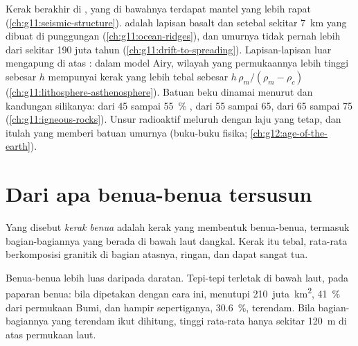\begin{recall}
Kerak berakhir di , yang di bawahnya terdapat mantel yang lebih rapat
(\cref{ch:g11:seismic-structure}).  adalah lapisan basalt dan 
setebal sekitar \qty{7}{km} yang dibuat di punggungan
(\cref{ch:g11:ocean-ridges}), dan umurnya tidak pernah lebih dari sekitar 190
juta tahun (\cref{ch:g11:drift-to-spreading}). Lapisan-lapisan luar mengapung
di atas : dalam model Airy, wilayah yang permukaannya lebih tinggi
sebesar $h$ mempunyai kerak yang lebih tebal sebesar $h\,\rho_m/(\rho_m -
\rho_c)$ (\cref{ch:g11:lithosphere-asthenosphere}). Batuan beku dinamai
menurut  dan kandungan silikanya:  dari 45 sampai
\qty{55}{\percent} ,  dari 55 sampai 65,  dari 65
sampai 75 (\cref{ch:g11:igneous-rocks}). Unsur radioaktif meluruh dengan laju
yang tetap, dan itulah yang memberi batuan umurnya (buku-buku fisika;
\cref{ch:g12:age-of-the-earth}).
\end{recall}

\section{Dari apa benua-benua tersusun}

\begin{definition}\label{def:g12:continental-crust:continental-crust}
Yang disebut \emph{kerak benua} adalah kerak yang membentuk
benua-benua, termasuk bagian-bagiannya yang berada di bawah laut dangkal. Kerak
itu tebal, rata-rata berkomposisi granitik di bagian atasnya, ringan, dan dapat
sangat tua.
\end{definition}

Benua-benua lebih luas daripada daratan. Tepi-tepi  terletak di bawah
laut, pada paparan benua: bila dipetakan dengan cara ini,  menutupi
\num{210}~juta~\unit{km^2}, \qty{41}{\percent} dari permukaan Bumi, dan hampir
sepertiganya, \qty{30.6}{\percent}, terendam. Bila bagian-bagiannya yang
terendam ikut dihitung, tinggi rata-rata  hanya sekitar
\qty{120}{m} di atas permukaan laut.

